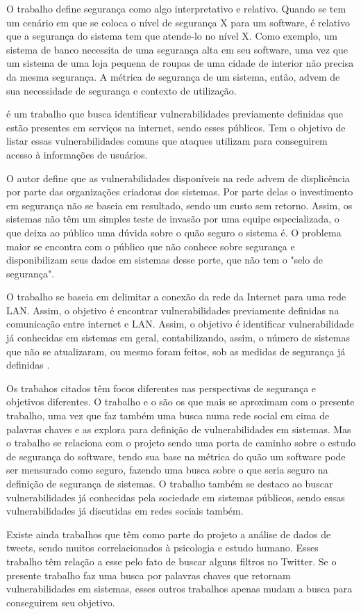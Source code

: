 O trabalho define segurança como algo interpretativo e relativo. Quando se tem um cenário em que se coloca o nível de segurança X para um software, é relativo que a segurança do sistema tem que atende-lo no nível X. Como exemplo, um sistema de banco necessita de uma segurança alta em seu software, uma vez que um sistema de uma loja pequena de roupas de uma cidade de interior não precisa da mesma segurança. A métrica de segurança de um sistema, então, advem de sua necessidade de segurança e contexto de utilização.

 é um trabalho que busca identificar vulnerabilidades previamente definidas que estão presentes em serviços na internet, sendo esses públicos. Tem o objetivo de listar essas vulnerabilidades comuns que ataques utilizam para conseguirem acesso à informações de usuários.

O autor define que as vulnerabilidades disponíveis na rede advem de displicência por parte das organizações criadoras dos sistemas. Por parte delas o investimento em segurança não se baseia em resultado, sendo um custo sem retorno. Assim, os sistemas não têm um simples teste de invasão por uma equipe especializada, o que deixa ao público uma dúvida sobre o quão seguro o sistema é. O problema maior se encontra com o público que não conhece sobre segurança e disponibilizam seus dados em sistemas desse porte, que não tem o "selo de segurança".

O trabalho se baseia em delimitar a conexão da rede da Internet para uma rede LAN. Assim, o objetivo é encontrar vulnerabilidades previamente definidas na comunicação entre internet e LAN. Assim, o objetivo é identificar vulnerabilidade já conhecidas em sistemas em geral, contabilizando, assim, o número de sistemas que não se atualizaram, ou mesmo foram feitos, sob as medidas de segurança já definidas \cite{Kroth2018}.

Os trabahos citados têm focos diferentes nas perspectivas de segurança e objetivos diferentes. O trabalho  e o  são os que mais se aproximam com o presente trabalho, uma vez que faz também uma busca numa rede social em cima de palavras chaves e as explora para definição de vulnerabilidades em sistemas. Mas o trabalho  se relaciona com o projeto sendo uma porta de caminho sobre o estudo de segurança do software, tendo sua base na métrica do quão um software pode ser mensurado como seguro, fazendo uma busca sobre o que seria seguro na definição de segurança de sistemas. O trabalho  também se destaco ao buscar vulnerabilidades já conhecidas pela sociedade em sistemas públicos, sendo essas vulnerabilidades já discutidas em redes sociais também. 

Existe ainda trabalhos que têm como parte do projeto a análise de dados de tweets, sendo muitos correlacionados à psicologia e estudo humano. Esses trabalho têm relação a esse pelo fato de buscar alguns filtros no Twitter. Se o presente trabalho faz uma busca por palavras chaves que retornam vulnerabilidades em sistemas, esses outros trabalhos apenas mudam a busca para conseguirem seu objetivo.